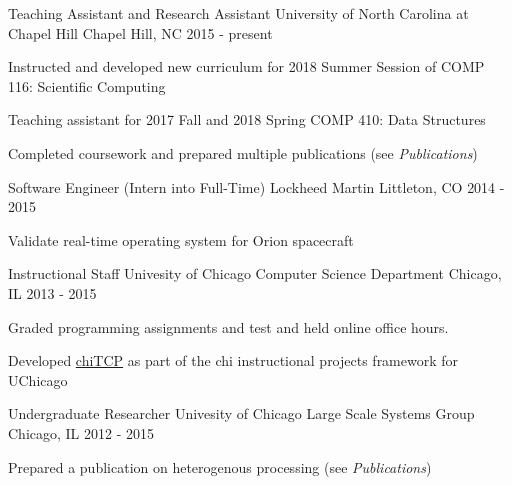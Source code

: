 
\begin{cventries}
  \cventry
    {Teaching Assistant and Research Assistant} %
    {University of North Carolina at Chapel Hill} %
    {Chapel Hill, NC} %
    {2015 - present} %
    {
      \begin{cvitems} %
        \item {Instructed and developed new curriculum for 2018 Summer Session of COMP 116:  Scientific Computing}
	\item {Teaching assistant for 2017 Fall and 2018 Spring COMP 410: Data Structures}
	\item {Completed coursework and prepared multiple publications (see \textit{Publications})}
      \end{cvitems}
    }

  \cventry
    {Software Engineer (Intern into Full-Time)} %
    {Lockheed Martin} %
    {Littleton, CO} %
    {2014 - 2015} %
    {
      \begin{cvitems} %
        \item {Validate real-time operating system for Orion spacecraft}
      \end{cvitems}
    }

  \cventry
    {Instructional Staff} %
    {Univesity of Chicago Computer Science Department} %
    {Chicago, IL} %
    {2013 - 2015} %
    {
      \begin{cvitems} %
        \item {Graded programming assignments and test and held online office hours.}
	\item {Developed \href{https://chi.cs.uchicago.edu/chitcp/index.html}{chiTCP} as part of the chi instructional projects framework for UChicago}
      \end{cvitems}
    }

  \cventry
    {Undergraduate Researcher} %
    {Univesity of Chicago Large Scale Systems Group} %
    {Chicago, IL} %
    {2012 - 2015} %
    {
      \begin{cvitems} %
        \item {Prepared a publication on heterogenous processing (see \textit{Publications})}
      \end{cvitems}
    }



\end{cventries}
